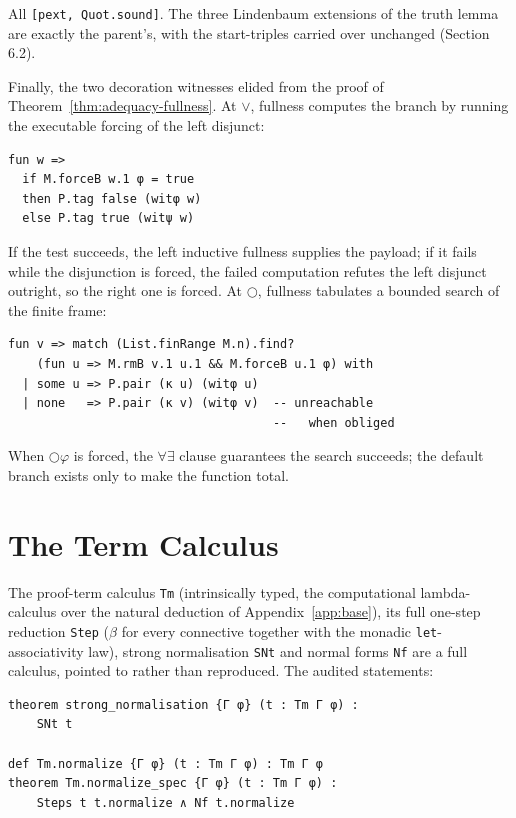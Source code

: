 \noindent All \texttt{[pext, Quot.sound]}. The three Lindenbaum
extensions of the truth lemma are exactly the parent's, with the
start-triples carried over unchanged (Section 6.2).

Finally, the two decoration witnesses elided from the proof of
Theorem~\ref{thm:adequacy-fullness}. At \ensuremath{\vee}, fullness computes
the branch by running the executable forcing of the left disjunct:

\begin{lstlisting}
fun w =>
  if M.forceB w.1 φ = true
  then P.tag false (witφ w)
  else P.tag true (witψ w)
\end{lstlisting}

\noindent If the test succeeds, the left inductive fullness supplies the
payload; if it fails while the disjunction is forced, the failed
computation refutes the left disjunct outright, so the right one is
forced. At \ensuremath{\bigcirc}, fullness tabulates a bounded search of the
finite frame:

\begin{lstlisting}
fun v => match (List.finRange M.n).find?
    (fun u => M.rmB v.1 u.1 && M.forceB u.1 φ) with
  | some u => P.pair (κ u) (witφ u)
  | none   => P.pair (κ v) (witφ v)  -- unreachable
                                     --   when obliged
\end{lstlisting}

\noindent When \ensuremath{\bigcirc\varphi} is forced, the \ensuremath{\forall\exists}
clause guarantees the search succeeds; the default branch exists only to
make the function total.

\section{The Term Calculus}\label{app:terms}

The proof-term calculus \texttt{Tm} (intrinsically typed, the
computational lambda-calculus over the natural deduction of
Appendix~\ref{app:base}), its full one-step reduction \texttt{Step}
(\ensuremath{\beta} for every connective together with the monadic
\texttt{let}-associativity law), strong normalisation \texttt{SNt} and
normal forms \texttt{Nf} are a full calculus, pointed to rather than
reproduced. The audited statements:

\begin{lstlisting}
theorem strong_normalisation {Γ φ} (t : Tm Γ φ) :
    SNt t

def Tm.normalize {Γ φ} (t : Tm Γ φ) : Tm Γ φ
theorem Tm.normalize_spec {Γ φ} (t : Tm Γ φ) :
    Steps t t.normalize ∧ Nf t.normalize
\end{lstlisting}


